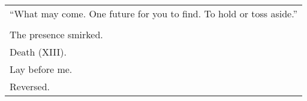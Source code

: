 \documentclass{article}
\begin{document}
\begin{center}
\begin{tabular}{l}
``What may come.  One future for you to find.  To hold or toss aside.'' \\
\\
The presence smirked. \\
Death (XIII). \\
Lay before me. \\
Reversed. \\
\end{tabular}
\end{center}
\end{document}
